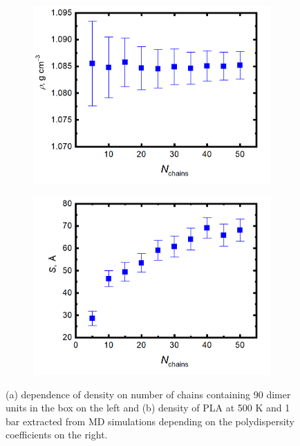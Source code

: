 \begin{figure}[htb!]
	\begin{subfigure}{0.5\textwidth}
		\centering
		\includegraphics[width=1\linewidth]{img/box_density_5_50.png}
		\caption{}
		\label{fig:box}
	\end{subfigure}
	\begin{subfigure}{0.5\textwidth}
		\centering
		\includegraphics[width=1\linewidth]{img/konce_5_50.png}
		\caption{}
		\label{fig:box_konce}
	\end{subfigure}   	
	\caption{(a) dependence of density on number of chains containing 90 dimer units in the box on the left and (b) density of PLA at 500 K and 1 bar extracted from MD simulations depending on the polydispersity coefficients on the right.}
	\vspace{-0.2cm}
\end{figure}

